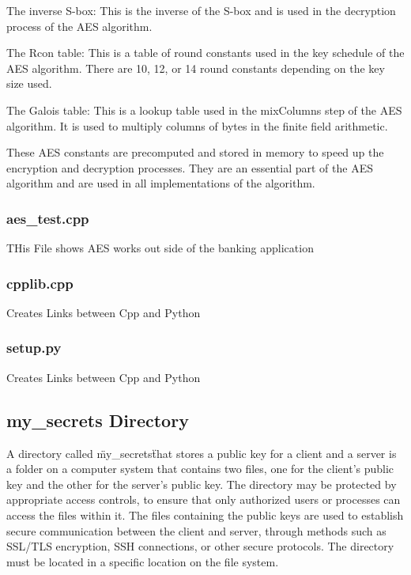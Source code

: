 \documentclass{article}
\begin{document}
The inverse S-box: This is the inverse of the S-box and is used in the decryption process of the AES algorithm.

The Rcon table: This is a table of round constants used in the key schedule of the AES algorithm. There are 10, 12, or 14 round constants depending on the key size used.

The Galois table: This is a lookup table used in the mixColumns step of the AES algorithm. It is used to multiply columns of bytes in the finite field arithmetic.

These AES constants are precomputed and stored in memory to speed up the encryption and decryption processes. They are an essential part of the AES algorithm and are used in all implementations of the algorithm.
\subsubsection{aes\_test.cpp}
THis File shows AES works out side of the banking application
\subsubsection{cpplib.cpp}
Creates Links between Cpp and Python
\subsubsection{setup.py}
Creates Links between Cpp and Python

\newpage
\subsection{my\_secrets Directory}
A directory called \"my\_secrets\" that stores a public key for a client and a server is a folder on a computer system that contains two files, one for the client's public key and the other for the server's public key.
The directory may be protected by appropriate access controls, to ensure that only authorized users or processes can access the files within it.
The files containing the public keys are used to establish secure communication between the client and server, through methods such as SSL/TLS encryption, SSH connections, or other secure protocols.
The directory must be located in a specific location on the file system.

\newpage
\end{document}
